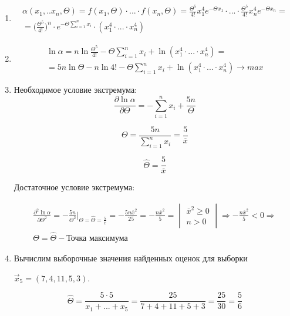 \documentclass[a4paper,14pt]{extreport} %
\begin{document}
\begin{enumerate}

\item

\begin{multline*}
\alpha(x_1,..x_n,\Theta)=f(x_1,\Theta)\cdot ... \cdot f(x_n,\Theta)=\frac{\Theta^5}{4!}x_1^4 e^{-\Theta x_1}\cdot ... \cdot \frac{\Theta^5}{4!}x_n^4 e^{-\Theta x_n}=\\
=\bigg(\frac{\Theta^5}{4!}\bigg)^n \cdot e^{-\Theta \sum_{i=1}^{n}x_i}\cdot (x_1^4\cdot ... \cdot x_n^4)
\end{multline*}

\item

\begin{multline*}
\ln \alpha= n\ln\frac{\Theta^5}{4!}  -\Theta \sum_{i=1}^{n}x_i + \ln(x_1^4\cdot ... \cdot x_n^4)=\\=5n\ln\Theta-n\ln4!-\Theta \sum_{i=1}^{n}x_i + \ln(x_1^4\cdot ... \cdot x_n^4) \rightarrow max
\end{multline*}

\item

Необходимое условие экстремума:
$$\frac{\partial \ln\alpha}{\partial \Theta}=-\sum_{i=1}^{n}x_i + \frac{5n}{\Theta}$$

$$\Theta=\frac{5n}{\sum_{i=1}^{n}x_i}=\frac{5}{\overline x}$$

$$\hat \Theta = \frac{5}{\overline x}$$

Достаточное условие экстремума:

\begin{multline*}
\frac{\partial^2 \ln\alpha}{\partial \Theta^2}=-\frac{5n}{\Theta^2}\bigg|_{\Theta = \hat \Theta = \frac{5}{\overline x}}=-\frac{5n\overline x^2}{25}=-\frac{n\overline x^2}{5}=
\begin{vmatrix}
\overline x^2\ge 0\\
n > 0
\end{vmatrix} \Rightarrow -\frac{n\overline x^2}{5} < 0  \Rightarrow \\ \Theta = \hat \Theta - \text{Точка максимума}
\end{multline*}

\item Вычислим выборочные значения найденных оценок для выборки 

$\vec x_5 = (7,4,11,5,3)$. 

$$\hat \Theta = \frac{5\cdot 5}{x_1+...+x_5}=\frac{25}{7+4+11+5+3}=\frac{25}{30}=\frac{5}{6}$$
\end{enumerate}
\end{document}
